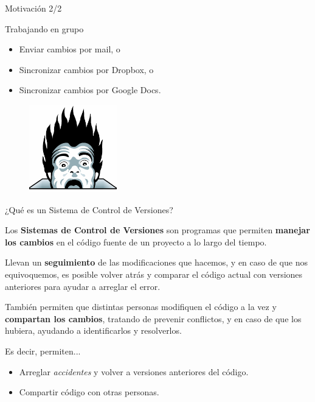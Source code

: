 \begin{frame}{Motivación 2/2}

    \begin{block}{Trabajando en grupo}
        \begin{itemize}
            \item Enviar cambios por mail, o
            \pause
            \item Sincronizar cambios por Dropbox, o
            \pause
            \item Sincronizar cambios por Google Docs.
        \end{itemize}
    \end{block}

    \pause
    \begin{figure}[h]
        \begin{center}
            \includegraphics[height=1.5in]{images/horror.png}
        \end{center}
    \end{figure}

\end{frame}

\begin{frame}{¿Qué es un Sistema de Control de Versiones?}

	\begin{block}{}
		Los \textbf{Sistemas de Control de Versiones} son programas que permiten \textbf{manejar los cambios} en el código fuente de un proyecto a lo largo del tiempo.

		Llevan un \textbf{seguimiento} de las modificaciones que hacemos, y en caso de que nos equivoquemos, es posible volver atrás y comparar el código actual con versiones anteriores para ayudar a arreglar el error.

		También permiten que distintas personas modifiquen el código a la vez y \textbf{compartan los cambios}, tratando de prevenir conflictos, y en caso de que los hubiera, ayudando a identificarlos y resolverlos.

	\end{block}

    \pause
    \begin{resumen}{Es decir, permiten...}
        \begin{itemize}
            \item Arreglar \textit{accidentes} y volver a versiones anteriores del código.
            \item Compartir código con otras personas.
        \end{itemize}
	\end{resumen}

\end{frame}

